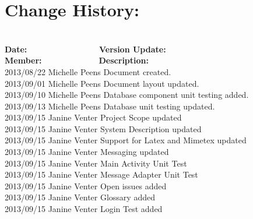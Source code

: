 \documentclass[29pt,a4paper]{moderncv}
\begin{document}
\section{\textbf{Change History:}}
\begin{tabbing}
\\\textbf{Date:} ~~~~~~~~~~~~~~~~~\= \textbf{Version Update:}~~~~~~~ \= \textbf{Member:}~~~~~~~~~~~~~~\= \textbf{Description:}\\
2013/08/22  \> Michelle Peens \> Document created.\\
2013/09/01  \> Michelle Peens \> Document layout updated.\\
2013/09/10  \> Michelle Peens \> Database component unit testing added.\\
2013/09/13  \> Michelle Peens \> Database unit testing updated.\\
2013/09/15  \> Janine Venter \> Project Scope updated\\
2013/09/15  \> Janine Venter\> System Description updated\\
2013/09/15  \> Janine Venter \>Support for Latex and Mimetex updated\\
2013/09/15  \> Janine Venter \> Messaging updated\\
2013/09/15  \> Janine Venter \> Main Activity Unit Test\\
2013/09/15  \> Janine Venter \> Message Adapter Unit Test\\
2013/09/15  \> Janine Venter \> Open issues added\\
2013/09/15  \> Janine Venter \> Glossary added\\
2013/09/15  \> Janine Venter \> Login Test added\\


\end{tabbing}

\newpage
\end{document}

